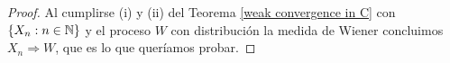 \documentclass[12pt,oneside]{book}
\numberwithin{equation}{chapter}
\begin{document}
\begin{proof}
    Al cumplirse (i) y (ii) del Teorema \ref{weak convergence in C} con $\{X_n:n\in\N\}$ y el proceso $W$ con distribución la medida de Wiener concluimos $X_n\Rightarrow W$, que es lo que queríamos probar. 
\end{proof}
\nocite{*}
\printbibliography
\end{document}
